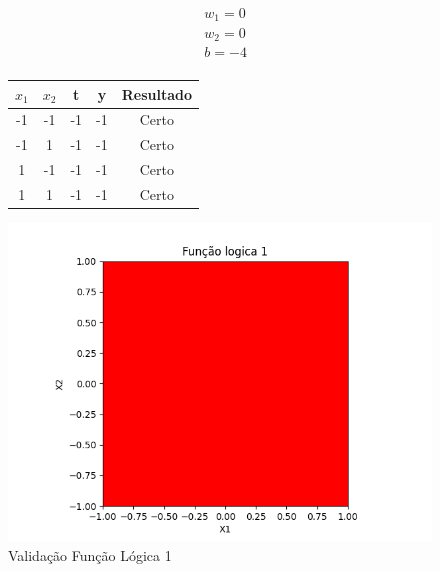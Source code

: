 \begin{figure}[h!]
\centering
\begin{minipage}[c]{0.49\linewidth}
\centering
\[
\begin{aligned}
&w_1 = 0\\
&w_2 = 0\\
&b = -4\\
\end{aligned}
\]
\begin{tabular}{|c|c|c|c|c|}\hline
$x_1$ & $x_2$ & t & y & Resultado\\ \hline
 -1 & -1 & -1 & -1 & Certo\\ \hline
 -1 & 1 & -1 & -1 & Certo\\ \hline
 1 & -1 & -1 & -1 & Certo\\ \hline
 1 & 1 & -1 & -1 & Certo\\ \hline
\end{tabular}
\end{minipage}
\hfill
\begin{minipage}[c]{0.5\linewidth}
\centering
\singlespacing
\includegraphics[width=1.2\textwidth]{im/im1}
\end{minipage}
\caption{Validação Função Lógica 1}
\label{vl1}
\end{figure}

